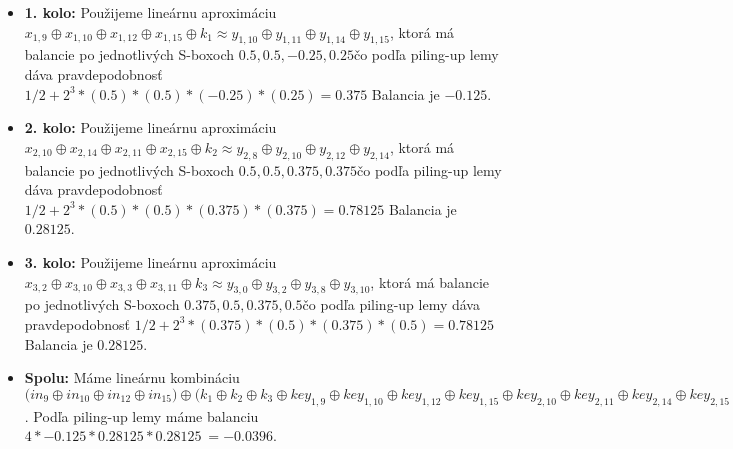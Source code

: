 \begin{itemize}
\item {\bf 1. kolo:}
Použijeme lineárnu aproximáciu $
x_{1,9} \oplus x_{1,10} \oplus x_{1,12} \oplus x_{1,15}  \oplus k_{1} 
 \approx 
y_{1,10} \oplus y_{1,11} \oplus y_{1,14} \oplus y_{1,15} $,
ktorá má balancie po jednotlivých S-boxoch $
0.5,0.5,-0.25,0.25
$čo podľa piling-up lemy dáva pravdepodobnosť 
$1/2 + 2^3*( 0.5)*(0.5)*(-0.25)*(0.25 )= 0.375 $
Balancia je $-0.125$.

\item {\bf 2. kolo:}
Použijeme lineárnu aproximáciu $
x_{2,10} \oplus x_{2,14} \oplus x_{2,11} \oplus x_{2,15}  \oplus k_{2} 
 \approx 
y_{2,8} \oplus y_{2,10} \oplus y_{2,12} \oplus y_{2,14} $,
ktorá má balancie po jednotlivých S-boxoch $
0.5,0.5,0.375,0.375
$čo podľa piling-up lemy dáva pravdepodobnosť 
$1/2 + 2^3*( 0.5)*(0.5)*(0.375)*(0.375 )= 0.78125 $
Balancia je $0.28125$.

\item {\bf 3. kolo:}
Použijeme lineárnu aproximáciu $
x_{3,2} \oplus x_{3,10} \oplus x_{3,3} \oplus x_{3,11}  \oplus k_{3} 
 \approx 
y_{3,0} \oplus y_{3,2} \oplus y_{3,8} \oplus y_{3,10} $,
ktorá má balancie po jednotlivých S-boxoch $
0.375,0.5,0.375,0.5
$čo podľa piling-up lemy dáva pravdepodobnosť 
$1/2 + 2^3*( 0.375)*(0.5)*(0.375)*(0.5 )= 0.78125 $
Balancia je $0.28125$.

\item {\bf Spolu:}  Máme lineárnu kombináciu $ \Big(
in_{9} \oplus in_{10} \oplus in_{12} \oplus in_{15}
\Big) \oplus \Big( k_1 \oplus k_2 \oplus k_3 \oplus 
key_{1,9} \oplus key_{1,10} \oplus key_{1,12} \oplus key_{1,15} \oplus key_{2,10} \oplus key_{2,11} \oplus key_{2,14} \oplus key_{2,15} \oplus key_{3,2} \oplus key_{3,3} \oplus key_{3,10} \oplus key_{3,11} \oplus key_{4,0} \oplus key_{4,2} \oplus key_{4,8} \oplus key_{4,10} \Big) \approx \Big(
out_{0} \oplus out_{2} \oplus out_{8} \oplus out_{10}
\Big) $.
Podľa piling-up lemy máme balanciu $4* -0.125*0.28125*0.28125 ~= -0.0396 $.
\end{itemize}
